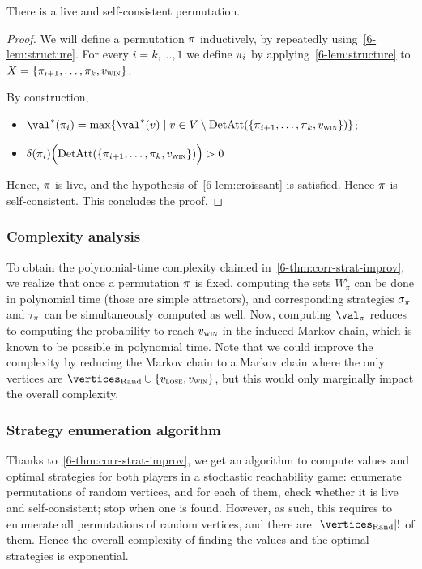 \begin{lemma}
\label{stoch:lemma-existence}
There is a live and self-consistent permutation.
\end{lemma}

\begin{proof}
We will define a permutation $\pi$ inductively, by repeatedly using~\cref{6-lem:structure}.
For every $i =k, \ldots ,1$ we define $\pi_i$ by applying~\cref{6-lem:structure} to 
$X = \{\pi_{i+1},\ldots,\pi_k,v_{\textsc{win}}\}$.

By construction,
\begin{itemize}
\item $\val^*(\perm_i) = \max \{\val^*(v) \mid v \in V \setminus
  \DetAtt(\{\perm_{i+1},\ldots,\perm_k,\vwin\})\}$;
\item $\delta(\pi_i)\Big(\textrm{DetAtt}(\{\pi_{i+1},\ldots,\pi_k,v_{\textsc{win}}\})\Big) >0$
\end{itemize}
Hence, $\pi$ is live, and the hypothesis of~\cref{6-lem:croissant} is satisfied. Hence $\pi$ is
self-consistent. This concludes the proof.
\end{proof}

\subsubsection{Complexity analysis}

To obtain the polynomial-time complexity claimed in~\cref{6-thm:corr-strat-improv}, 
we realize that once a permutation $\pi$ is fixed, computing the sets $W_\pi^i$ can be done
in polynomial time (those are simple attractors), and corresponding
strategies $\sigma_\pi$ and $\tau_\pi$ can be simultaneously
computed as well. Now, computing $\val_\perm$ reduces to computing the
probability to reach $v_{\textsc{win}}$ in the induced Markov chain, which is
known to be possible in polynomial time. Note that we could improve
the complexity by reducing the Markov chain to a Markov chain where
the only vertices are $\Randomvertices \cup \{\vlose,\vwin\}$, but
this would only marginally impact the overall complexity.

\subsubsection{Strategy enumeration algorithm}
\label{6-subsec:last}

Thanks to~\cref{6-thm:corr-strat-improv}, we get an algorithm
to compute values and optimal strategies for both players in a
stochastic reachability game: enumerate permutations of random
vertices, and for each of them, check whether it is live and
self-consistent; stop when one is found.
%
However, as such, this requires to enumerate all permutations of
random vertices, and there are $|\Randomvertices|!$ of them. Hence the
overall complexity of finding the values and the optimal strategies is
exponential.



